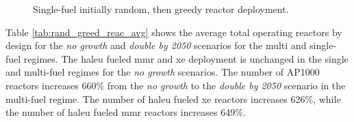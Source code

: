 \begin{figure}[H]
    \hfill
    \caption{Single-fuel initially random, then greedy reactor deployment.}
    \label{fig:rand_greed_of_reactors}
\end{figure}

Table \ref{tab:rand_greed_reac_avg} shows the average total operating reactors by design for the \textit{no growth} and \textit{double by 2050} scenarios for the multi and single-fuel regimes. The \gls{haleu} fueled \gls{mmr} and \gls{xe} deployment is unchanged in the single and multi-fuel regimes for the \textit{no growth} scenarios. The number of AP1000 reactors increases 660\% from the \textit{no growth} to the \textit{double by 2050} scenario in the multi-fuel regime. The number of \gls{haleu} fueled \gls{xe} reactors increases 626\%, while the number of \gls{haleu} fueled \gls{mmr} reactors increases 649\%.

